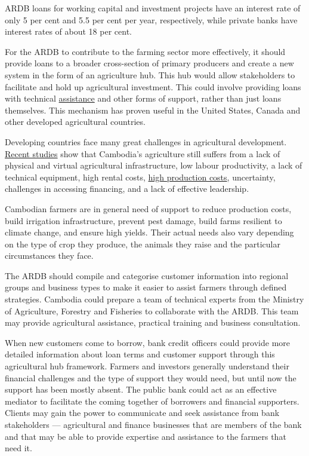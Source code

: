 \documentclass[10pt,a4paper]{letter}
\begin{document}
ARDB loans for working capital and investment projects have an interest rate of only 5 per cent and 5.5 per cent per year, respectively, while private banks have interest rates of about 18 per cent.

For the ARDB to contribute to the farming sector more effectively, it should provide loans to a broader cross-section of primary producers and create a new system in the form of an agriculture hub. This hub would allow stakeholders to facilitate and hold up agricultural investment. This could involve providing loans with technical \href{https://financingsustainablelandscapes.org/enhancing-farming-and-production/technical-assistance-farmers-and-producers.html}{assistance} and other forms of support, rather than just loans themselves. This mechanism has proven useful in the United States, Canada and other developed agricultural countries.

Developing countries face many great challenges in agricultural development. \href{https://nithkosal.github.io/research/papers/WP0002.pdf}{Recent studies} show that Cambodia's agriculture still suffers from a lack of physical and virtual agricultural infrastructure, low labour productivity, a lack of technical equipment, high rental costs, \href{https://link.springer.com/chapter/10.1007/978-981-15-0998-8_12}{high production costs}, uncertainty, challenges in accessing financing, and a lack of effective leadership.

Cambodian farmers are in general need of support to reduce production costs, build irrigation infrastructure, prevent pest damage, build farms resilient to climate change, and ensure high yields. Their actual needs also vary depending on the type of crop they produce, the animals they raise and the particular circumstances they face.

The ARDB should compile and categorise customer information into regional groups and business types to make it easier to assist farmers through defined strategies. Cambodia could prepare a team of technical experts from the Ministry of Agriculture, Forestry and Fisheries to collaborate with the ARDB. This team may provide agricultural assistance, practical training and business consultation.

When new customers come to borrow, bank credit officers could provide more detailed information about loan terms and customer support through this agricultural hub framework. Farmers and investors generally understand their financial challenges and the type of support they would need, but until now the support has been mostly absent. The public bank could act as an effective mediator to facilitate the coming together of borrowers and financial supporters. Clients may gain the power to communicate and seek assistance from bank stakeholders --- agricultural and finance businesses that are members of the bank and that may be able to provide expertise and assistance to the farmers that need it.
\end{document}
